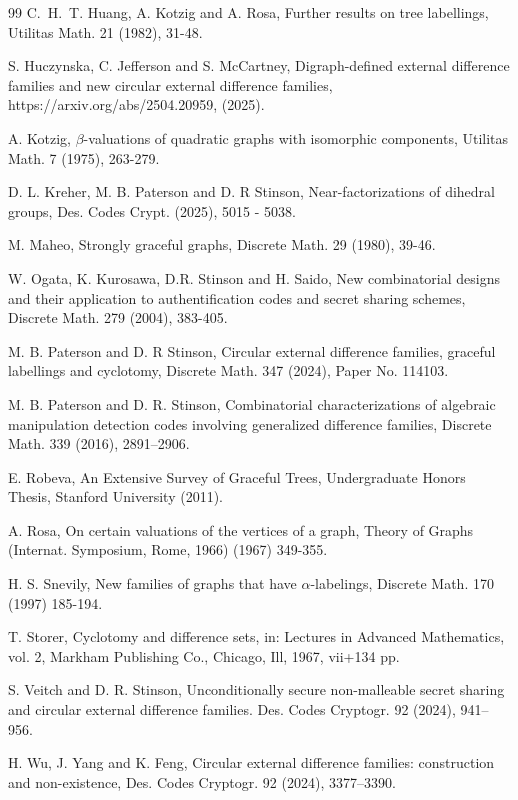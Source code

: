 \documentclass[12pt, a4paper]{article}
\theoremstyle{definition}
\begin{document}
\begin{thebibliography}{99}
C.~H.~T. Huang, A. Kotzig and A. Rosa, Further results on tree labellings, Utilitas Math. 21 (1982), 31-48.

S. Huczynska, C. Jefferson and S. McCartney, Digraph-defined external difference families and new circular external difference families, https://arxiv.org/abs/2504.20959, (2025).

A. Kotzig, $\beta$-valuations of quadratic graphs with isomorphic components, Utilitas Math. 7 (1975), 263-279.

D. L. Kreher, M. B. Paterson and D. R Stinson, Near-factorizations of dihedral groups, Des. Codes Crypt. (2025), 5015 - 5038.

M. Maheo, Strongly graceful graphs, Discrete Math. 29 (1980), 39-46.

  W. Ogata, K. Kurosawa, D.R. Stinson and H. Saido, New combinatorial designs and their application to authentification codes and secret sharing schemes, Discrete Math. 279 (2004), 383-405.

M. B. Paterson and D. R Stinson, Circular external difference families, graceful labellings and cyclotomy,
Discrete Math. 347 (2024), Paper No. 114103.

 M. B. Paterson and D. R. Stinson, Combinatorial characterizations of algebraic manipulation detection codes involving generalized difference families, Discrete Math. 339 (2016), 2891–2906.

E. Robeva, An Extensive Survey of Graceful Trees, Undergraduate Honors Thesis, Stanford University (2011).

A. Rosa, On certain valuations of the vertices of a graph, Theory of Graphs (Internat. Symposium, Rome, 1966) (1967) 349-355.

H. S. Snevily, New families of graphs that have $\alpha$-labelings, Discrete Math. 170 (1997) 185-194.

T. Storer, Cyclotomy and difference sets, in: Lectures in Advanced Mathematics, vol. 2, Markham Publishing Co., Chicago, Ill, 1967, vii+134 pp.

 S. Veitch and D. R. Stinson, Unconditionally secure non-malleable secret sharing and circular external difference families. Des. Codes Cryptogr. 92 (2024), 941–956.

 H. Wu, J. Yang and K. Feng, Circular external difference families: construction and non-existence, 
Des. Codes Cryptogr. 92 (2024), 3377–3390.

\end{thebibliography}
\end{document}
